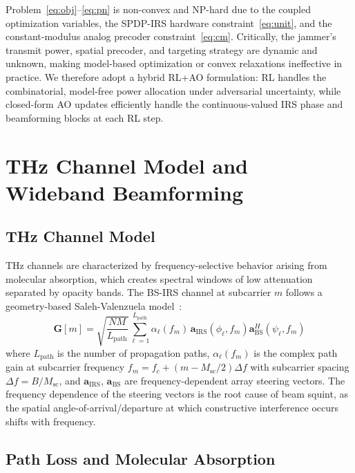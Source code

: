 \documentclass[journal,twocolumn]{IEEEtran}
\newcommand{\vect}[1]{\mathbf{#1}}
\newcommand{\mat}[1]{\mathbf{#1}}
\begin{document}
Problem~\eqref{eq:obj}--\eqref{eq:pn} is non-convex and NP-hard due to the coupled optimization variables, the SPDP-IRS hardware constraint~\eqref{eq:unit}, and the constant-modulus analog precoder constraint~\eqref{eq:cm}. Critically, the jammer's transmit power, spatial precoder, and targeting strategy are dynamic and unknown, making model-based optimization or convex relaxations ineffective in practice. We therefore adopt a hybrid RL+AO formulation: RL handles the combinatorial, model-free power allocation under adversarial uncertainty, while closed-form AO updates efficiently handle the continuous-valued IRS phase and beamforming blocks at each RL step.

\section{THz Channel Model and Wideband Beamforming}
\label{sec:thz}

\subsection{THz Channel Model}

THz channels are characterized by frequency-selective behavior arising from molecular absorption, which creates spectral windows of low attenuation separated by opacity bands. The BS-IRS channel at subcarrier $m$ follows a geometry-based Saleh-Valenzuela model~\cite{su2023wideband}:
\begin{equation}
\mat{G}[m] = \sqrt{\frac{N M}{L_{\text{path}}}} \sum_{\ell=1}^{L_{\text{path}}} \alpha_\ell(f_m)\, \vect{a}_{\text{IRS}}(\phi_\ell, f_m) \vect{a}_{\text{BS}}^H(\psi_\ell, f_m)
\label{eq:thz_channel}
\end{equation}
where $L_{\text{path}}$ is the number of propagation paths, $\alpha_\ell(f_m)$ is the complex path gain at subcarrier frequency $f_m = f_c + (m - M_{\text{sc}}/2)\Delta f$ with subcarrier spacing $\Delta f = B/M_{\text{sc}}$, and $\vect{a}_{\text{IRS}}$, $\vect{a}_{\text{BS}}$ are frequency-dependent array steering vectors. The frequency dependence of the steering vectors is the root cause of beam squint, as the spatial angle-of-arrival/departure at which constructive interference occurs shifts with frequency.

\subsection{Path Loss and Molecular Absorption}
\end{document}
